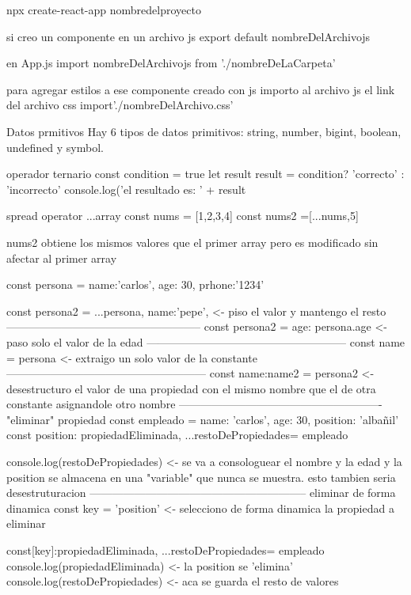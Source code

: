 
npx create-react-app nombredelproyecto

si creo un componente en un archivo js 
export default nombreDelArchivojs

en App.js
import nombreDelArchivojs from './nombreDeLaCarpeta'

para agregar estilos a ese componente creado con js
importo al archivo js el link del archivo css
import'./nombreDelArchivo.css'

Datos prmitivos
Hay 6 tipos de datos primitivos: string, number, bigint, boolean, undefined y symbol.



                operador ternario
const condition = true
let result
result = condition? 'correcto' : 'incorrecto'
console.log('el resultado es: ' + result 


                spread operator
...array
const nums = [1,2,3,4]
const nums2 =[...nums,5] 

nums2 obtiene los mismos valores que el primer array pero
es modificado sin afectar al primer array

const persona = {
    name:'carlos',
    age: 30,
    prhone:'1234'
}

const persona2 = {
...persona,
name:'pepe',     <- piso el valor y mantengo el resto
}
-----------------------------------------------------
const persona2 = {
    age: persona.age <- paso solo el valor de la edad
}
------------------------------------------------------
const {name} = persona <- extraigo un solo valor de la constante 
------------------------------------------------------
const {name:name2} = persona2 <- desestructuro el valor de una propiedad con el mismo nombre que el de otra constante asignandole otro nombre
-------------------------------------------------------
                        "eliminar" propiedad
const empleado = {
    name: 'carlos',
    age: 30,
    position: 'albañil'
}
const {position: propiedadEliminada, ...restoDePropiedades}= empleado

console.log(restoDePropiedades) <- se va a consologuear el nombre y la edad y la position se almacena en una "variable" que nunca se muestra. esto tambien seria desestruturacion 
-----------------------------------------------------------
                        eliminar de forma dinamica
const key = 'position' <- selecciono de forma dinamica la propiedad a eliminar

const{[key]:propiedadEliminada, ...restoDePropiedades}= empleado
console.log(propiedadEliminada) <- la position se 'elimina'
console.log(restoDePropiedades) <- aca se guarda el resto de valores


